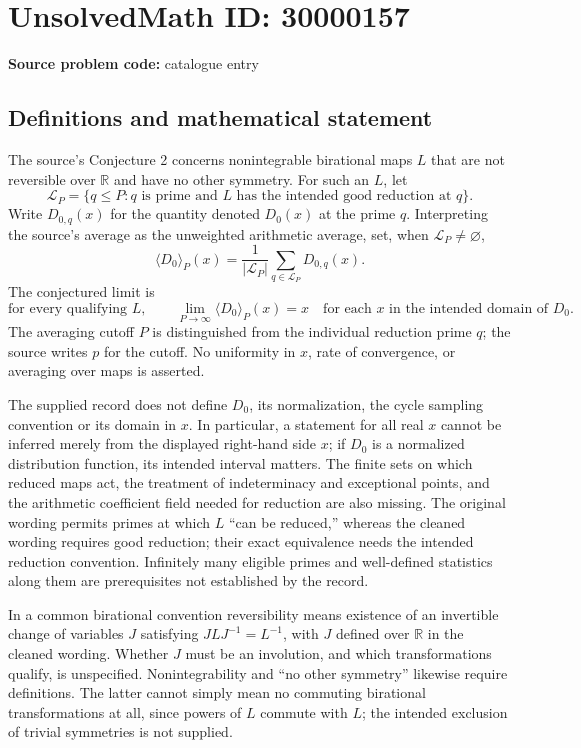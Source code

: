 \documentclass[11pt]{article}
\newcommand{\R}{\mathbb{R}}
\begin{document}
\section*{UnsolvedMath ID: 30000157}
\textbf{Source problem code:} catalogue entry
\subsection{Definitions and mathematical statement}
The source's Conjecture 2 concerns nonintegrable birational maps \(L\) that are not reversible over \(\R\) and have no other symmetry. For such an \(L\), let
\[
 \mathcal L_P=\{q\leq P:q\text{ is prime and }L\text{ has the intended good reduction at }q\}.
\]
Write \(D_{0,q}(x)\) for the quantity denoted \(D_0(x)\) at the prime \(q\). Interpreting the source's average as the unweighted arithmetic average, set, when \(\mathcal L_P\ne\varnothing\),
\[
 \langle D_0\rangle_P(x)=\frac{1}{|\mathcal L_P|}
 \sum_{q\in\mathcal L_P}D_{0,q}(x).
\]
The conjectured limit is
\[
 \text{for every qualifying }L,\qquad
 \lim_{P\to\infty}\langle D_0\rangle_P(x)=x
 \quad\text{for each }x\text{ in the intended domain of }D_0.
\]
The averaging cutoff \(P\) is distinguished from the individual reduction prime \(q\); the source writes \(p\) for the cutoff. No uniformity in \(x\), rate of convergence, or averaging over maps is asserted.

The supplied record does not define \(D_0\), its normalization, the cycle sampling convention or its domain in \(x\). In particular, a statement for all real \(x\) cannot be inferred merely from the displayed right-hand side \(x\); if \(D_0\) is a normalized distribution function, its intended interval matters. The finite sets on which reduced maps act, the treatment of indeterminacy and exceptional points, and the arithmetic coefficient field needed for reduction are also missing. The original wording permits primes at which \(L\) ``can be reduced,'' whereas the cleaned wording requires good reduction; their exact equivalence needs the intended reduction convention. Infinitely many eligible primes and well-defined statistics along them are prerequisites not established by the record.

In a common birational convention reversibility means existence of an invertible change of variables \(J\) satisfying \(JLJ^{-1}=L^{-1}\), with \(J\) defined over \(\R\) in the cleaned wording. Whether \(J\) must be an involution, and which transformations qualify, is unspecified. Nonintegrability and ``no other symmetry'' likewise require definitions. The latter cannot simply mean no commuting birational transformations at all, since powers of \(L\) commute with \(L\); the intended exclusion of trivial symmetries is not supplied.
\end{document}
